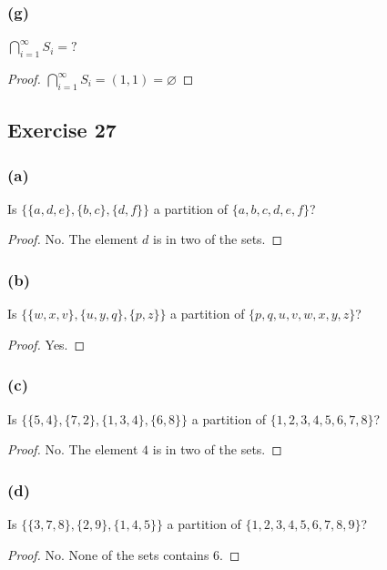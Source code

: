 \documentclass[14pt]{extarticle}
\newcommand{\es}{\varnothing}
\newcommand{\dps}{\displaystyle}
\begin{document}
\subsubsection{(g)}
\(\dps \bigcap_{i=1}^{\infty}S_i = ?\)

\begin{proof}
\(\dps \bigcap_{i=1}^{\infty}S_i = (1, 1) = \es\)
\end{proof}

\subsection{Exercise 27}

\subsubsection{(a)}
Is \(\{\{a, d, e\}, \{b, c\}, \{d, f\}\}\) a partition of
\(\{a, b, c, d, e, f\}\)?

\begin{proof}
No. The element $d$ is in two of the sets.
\end{proof}

\subsubsection{(b)}
Is \(\{\{w, x, v\}, \{u, y, q\}, \{p, z\}\}\) a partition of \(\{p, q, u, v, w, x, y, z\}\)?

\begin{proof}
Yes.
\end{proof}

\subsubsection{(c)}
Is \(\{\{5, 4\}, \{7, 2\}, \{1, 3, 4\}, \{6, 8\}\}\) a partition of \(\{1, 2, 3, 4, 5, 6, 7, 8\}\)?

\begin{proof}
No. The element $4$ is in two of the sets.
\end{proof}

\subsubsection{(d)}
Is \(\{\{3, 7, 8\}, \{2, 9\}, \{1, 4, 5\}\}\) a partition of \(\{1, 2, 3, 4, 5, 6, 7, 8, 9\}\)?

\begin{proof}
No. None of the sets contains 6.
\end{proof}
\end{document}
